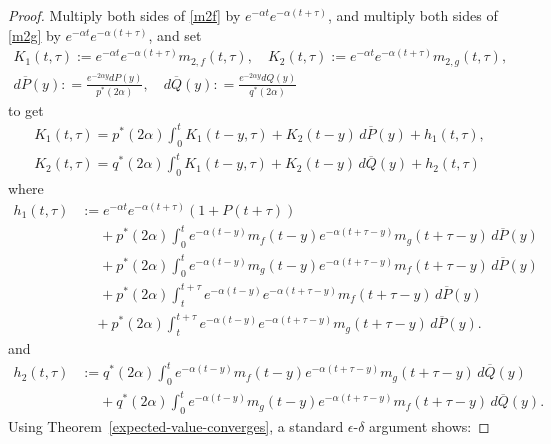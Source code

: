 \documentclass[12pt]{amsart}
\theoremstyle{plain}
\theoremstyle{definition}
\theoremstyle{remark}
\theoremstyle{definition}
\begin{document}
\begin{proof}
Multiply both sides of \eqref{m2f} by $e^{-\alpha t}e^{-\alpha(t+\tau)}$, and multiply both sides of \eqref{m2g} by $e^{-\alpha t}e^{-\alpha(t+\tau)}$, and set
\begin{gather}
K_1(t,\tau) := e^{-\alpha t}e^{-\alpha(t+\tau)} m_{2,f}(t,\tau), \quad
K_2(t,\tau) := e^{-\alpha t}e^{-\alpha(t+\tau)} m_{2,g}(t,\tau), \\
d\overline{P}(y) : = \frac{e^{-2\alpha y}dP(y)}{p^*(2\alpha)}, \quad
d\overline{Q}(y) : = \frac{e^{-2\alpha y}dQ(y)}{q^*(2\alpha)}
\end{gather}
to get
\begin{equation}
\begin{aligned}
K_1(t,\tau) = p^*(2\alpha) \int_0^t K_1(t-y,\tau)+K_2(t-y) \, d\overline{P}(y) + h_1(t,\tau), \\
K_2(t,\tau) = q^*(2\alpha) \int_0^t K_1(t-y,\tau)+K_2(t-y) \, d\overline{Q}(y) + h_2(t,\tau)
\end{aligned}
\label{k12}
\end{equation}
where
\begin{equation}
\begin{aligned}
h_1(t,\tau) & := e^{-\alpha t} e^{-\alpha(t+\tau)} (1+P(t+\tau)) \\
& \phantom{{}={}} + p^*(2\alpha) \int_0^t e^{-\alpha(t-y)}m_f(t-y) e^{-\alpha(t+\tau-y)}m_g(t+\tau-y) \, d\overline{P}(y) \\
& \phantom{{}={}} + p^*(2\alpha) \int_0^t e^{-\alpha(t-y)}m_g(t-y) e^{-\alpha(t+\tau-y)}m_f(t+\tau-y) \, d\overline{P}(y) \\
& \phantom{{}={}} + p^*(2\alpha) \int_t^{t+\tau} e^{-\alpha(t-y)} e^{-\alpha(t+\tau-y)} m_f(t+\tau - y) \, d\overline{P}(y) \\
&\quad + p^*(2\alpha) \int_t^{t+\tau} e^{-\alpha(t-y)} e^{-\alpha(t+\tau-y)} m_g(t+\tau - y)  \, d\overline{P}(y).
\end{aligned}
\end{equation}
and
\begin{equation}
\begin{aligned}
h_2(t,\tau) & := q^*(2\alpha) \int_0^t e^{-\alpha(t-y)}m_f(t-y) e^{-\alpha(t+\tau-y)}m_g(t+\tau-y) \, d\overline{Q}(y) \\
& \phantom{{}={}} + q^*(2\alpha) \int_0^t e^{-\alpha(t-y)}m_g(t-y) e^{-\alpha(t+\tau-y)}m_f(t+\tau-y) \, d\overline{Q}(y).
\end{aligned}
\end{equation}
Using Theorem~\ref{expected-value-converges}, a standard $\epsilon$-$\delta$ argument shows:

\end{proof}
\end{document}
